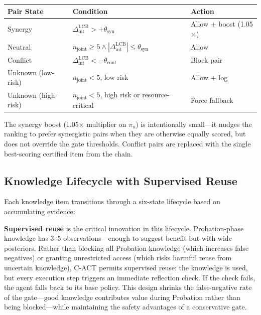 \documentclass[letterpaper]{article}
\begin{document}
\begin{center}
\begin{tabular}{lll}
\toprule
\textbf{Pair State} & \textbf{Condition} & \textbf{Action} \\
\midrule
Synergy   & $\Delta_{\text{int}}^{\text{LCB}} > +\theta_{\text{syn}}$ & Allow + boost (1.05$\times$) \\
Neutral   & $n_{\text{joint}} \ge 5 \land |\Delta_{\text{int}}^{\text{LCB}}| \le \theta_{\text{syn}}$ & Allow \\
Conflict  & $\Delta_{\text{int}}^{\text{LCB}} < -\theta_{\text{conf}}$ & Block pair \\
Unknown (low-risk)  & $n_{\text{joint}} < 5$, low risk & Allow + log \\
Unknown (high-risk) & $n_{\text{joint}} < 5$, high risk or resource-critical & Force fallback \\
\bottomrule
\end{tabular}
\end{center}

The synergy boost (1.05$\times$ multiplier on $\pi_u$) is intentionally small---it nudges the ranking to prefer synergistic pairs when they are otherwise equally scored, but does not override the gate thresholds. Conflict pairs are replaced with the single best-scoring certified item from the chain.

\subsection{Knowledge Lifecycle with Supervised Reuse}

Each knowledge item transitions through a six-state lifecycle based on accumulating evidence:

\begin{center}
\end{center}

\textbf{Supervised reuse} is the critical innovation in this lifecycle. Probation-phase knowledge has 3--5 observations---enough to suggest benefit but with wide posteriors. Rather than blocking all Probation knowledge (which increases false negatives) or granting unrestricted access (which risks harmful reuse from uncertain knowledge), \textsc{C-ACT} permits supervised reuse: the knowledge is used, but every execution step triggers an immediate reflection check. If the check fails, the agent falls back to its base policy. This design shrinks the false-negative rate of the gate---good knowledge contributes value during Probation rather than being blocked---while maintaining the safety advantages of a conservative gate.
\end{document}
